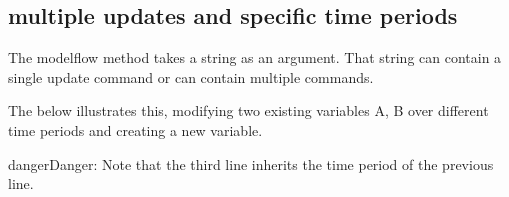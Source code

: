 \documentclass[letterpaper,10pt,english]{jupyterBook}
\begin{document}
\subsection{multiple updates and specific time periods}
\label{\detokenize{content/04_PythonEssentials/UpdateCommand:multiple-updates-and-specific-time-periods}}
\sphinxAtStartPar
The modelflow method  takes a string as an argument.  That string can contain a single update command or can contain multiple commands.

\sphinxAtStartPar
The below illustrates this, modifying two existing variables A, B over different time periods and creating a new variable.

\begin{sphinxadmonition}{danger}{Danger:}
\sphinxAtStartPar
Note that the third line inherits the time period of the previous line.
\end{sphinxadmonition}
\end{document}
